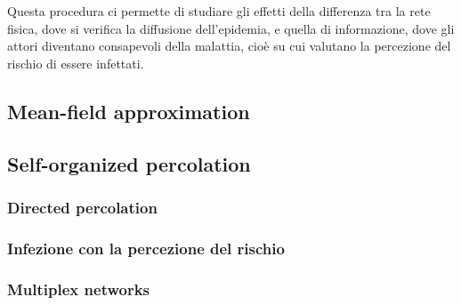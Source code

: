 Questa procedura ci permette di studiare gli effetti della differenza tra la rete fisica, dove si verifica la
diffusione dell'epidemia, e quella di informazione, dove gli attori diventano consapevoli della malattia,
cioè su cui valutano la percezione del rischio di essere infettati.

\subsection{Mean-field approximation}\label{subsec:mean-field-approximation}

\subsection{Self-organized percolation}\label{subsec:self-organized-percolation}

\subsubsection{Directed percolation}\label{subsubsec:directed-percolation}

\subsubsection{Infezione con la percezione del rischio}\label{subsubsec:infezione-con-la-percezione-del-rischio}

\subsubsection{Multiplex networks}\label{subsubsec:multiplex-networks}
